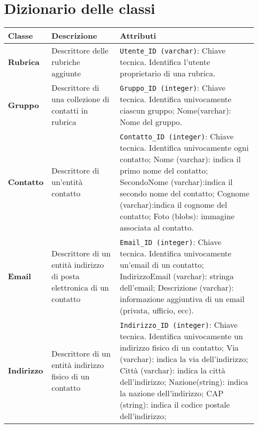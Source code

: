 \section{Dizionario delle classi}
\begin{longtable}{p{}p{}p{}}
\toprule
Classe & Descrizione & Attributi                                                                                                                          \\ \midrule
\textbf{Rubrica} &
Descrittore delle rubriche aggiunte &
\verb|Utente_ID (varchar)|: Chiave tecnica. Identifica l’utente proprietario di una rubrica. 
\\ \midrule
\textbf{Gruppo} &
Descrittore di una collezione di contatti in rubrica &
\verb|Gruppo_ID (integer)|: Chiave tecnica. Identifica univocamente ciascun gruppo;\newline
Nome(varchar): Nome del gruppo.
\\ \midrule
\textbf{Contatto} &
Descrittore di un'entità contatto &
\verb|Contatto_ID (integer)|: Chiave tecnica. Identifica univocamente ogni contatto;\newline
Nome (varchar): indica il primo nome del contatto;\newline
SecondoNome (varchar):indica il secondo nome del contatto;\newline
Cognome (varchar):indica il cognome del contatto;\newline
Foto (blobs): immagine associata al contatto.
\\ \midrule
\textbf{Email} &
Descrittore di un entità indirizzo di posta elettronica di un contatto &
\verb|Email_ID (integer)|: Chiave tecnica. Identifica univocamente un'email di un contatto;\newline
IndirizzoEmail (varchar): stringa dell'email;\newline
Descrizione (varchar): informazione aggiuntiva di un email (privata, ufficio, ecc).
\\ \midrule
\textbf{Indirizzo} &
Descrittore di un entità indirizzo fisico di un contatto &
\verb|Indirizzo_ID (integer)|: Chiave tecnica. Identifica univocamente un indirizzo fisico di un contatto; \newline
Via (varchar): indica la via dell’indirizzo;\newline
Città (varchar): indica la città dell’indirizzo;\newline
Nazione(string): indica la nazione dell’indirizzo;\newline
CAP (string): indica il codice postale dell'indirizzo;\newline

\end{longtable}
